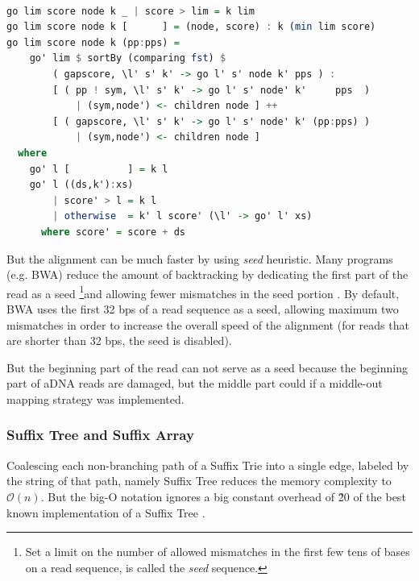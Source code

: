 \documentclass[11pt,a4paper]{report}
\begin{document}
\begin{lstlisting}[language=Haskell, basicstyle=\ttfamily\scriptsize, 
keywordstyle=\color{red}, frame=single ]

go lim score node k _ | score > lim = k lim
go lim score node k [      ] = (node, score) : k (min lim score)
go lim score node k (pp:pps) =
    go' lim $ sortBy (comparing fst) $
        ( gapscore, \l' s' k' -> go l' s' node k' pps ) :                   
        [ ( pp ! sym, \l' s' k' -> go l' s' node' k'     pps  )
            | (sym,node') <- children node ] ++
        [ ( gapscore, \l' s' k' -> go l' s' node' k' (pp:pps) ) 
            | (sym,node') <- children node ]
  where
    go' l [          ] = k l
    go' l ((ds,k'):xs)
        | score' > l = k l               
        | otherwise  = k' l score' (\l' -> go' l' xs)
      where score' = score + ds

\end{lstlisting}



But the alignment can be much faster by using \emph{seed} 
heuristic. 
Many programs (e.g. BWA) reduce the amount of backtracking  
by dedicating the first part of the read as a seed 
\footnote{ Set a limit on the number of allowed mismatches 
in the first few tens of bases on a read sequence, is called
the \emph{seed} sequence.}and allowing fewer mismatches in 
the seed portion \cite{bwa}. By default, BWA uses the first 
32 bps of a read sequence as a seed, allowing maximum two 
mismatches in order to increase the overall speed of the 
alignment (for reads that are shorter than 32 bps, the seed 
is disabled)\cite{bwa}. 

But the beginning part of the read can not serve as a seed
because the beginning part of aDNA reads are damaged,
but the middle part could if a middle-out mapping strategy
was implemented.




\subsubsection{Suffix Tree and Suffix Array}
\label{Suffix Tree and Suffix Array}

Coalescing each non-branching path of a Suffix Trie into 
a single edge, labeled by the string of that path, namely 
Suffix Tree reduces the memory complexity to $\mathcal{O}(n)$.
But the big-O notation ignores a big constant overhead 
of \~20 of the best known implementation of a Suffix Tree
\cite{gusfield1997algorithms}.\\ 
\end{document}
